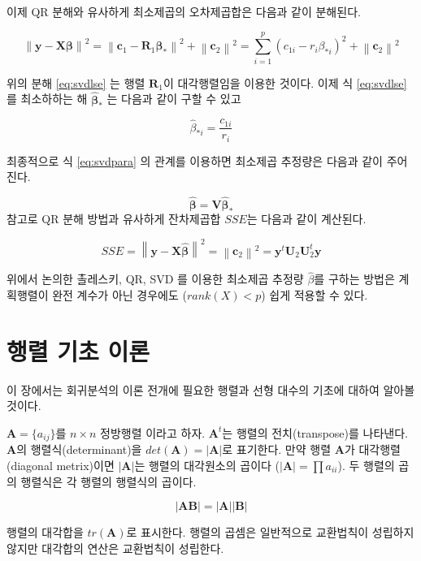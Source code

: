 \documentclass[
]{book}
\makeatletter
\newcommand{\norm}[1]{\left\lVert#1\right\rVert}
\newenvironment{kframe}{%
\medskip{}
\setlength{\fboxsep}{.8em}
 \def\at@end@of@kframe{}%
 \ifinner\ifhmode%
  \def\at@end@of@kframe{\end{minipage}}%
  \begin{minipage}{\columnwidth}%
 \fi\fi%
 \def\FrameCommand##1{\hskip\@totalleftmargin \hskip-\fboxsep
 \colorbox{shadecolor}{##1}\hskip-\fboxsep
     \hskip-\linewidth \hskip-\@totalleftmargin \hskip\columnwidth}%
 \MakeFramed {\advance\hsize-\width
   \@totalleftmargin\z@ \linewidth\hsize
   \@setminipage}}%
 {\par\unskip\endMakeFramed%
 \at@end@of@kframe}
\newenvironment{rmdblock}[1]
  {
  \begin{itemize}
  \renewcommand{\labelitemi}{
    \raisebox{-.7\height}[0pt][0pt]{
      {\setkeys{Gin}{width=3em,keepaspectratio}\texttt{[image: images/\#1]}}
    }
  }
  \setlength{\fboxsep}{1em}
  \begin{kframe}
  \item
  }
  {
  \end{kframe}
  \end{itemize}
  }
\newenvironment{rmdnote}
  {\begin{rmdblock}{note}}
  {\end{rmdblock}}
\theoremstyle{definition}
\theoremstyle{definition}
\theoremstyle{definition}
\theoremstyle{remark}
\makeatother
\begin{document}
이제 QR 분해와 유사하게 최소제곱의 오차제곱합은 다음과 같이 분해된다.

\begin{equation}
\norm{ \bm y-\bm X \bm \beta}^2  = 
\norm{ \bm c_1 - \bm R_1 \bm \beta_* }^2 + \norm{\bm c_2}^2 
 =\sum_{i=1}^p (c_{1i} - r_i \beta_{*i})^2 + \norm{\bm c_2}^2 
\label{eq:svdlse}
\end{equation}

위의 분해 \eqref{eq:svdlse} 는 행렬 \(\bm R_1\)이 대각행렬임을 이용한 것이다. 이제 식 \eqref{eq:svdlse} 를 최소하하는 해
\(\hat {\bm \beta}_*\) 는 다음과 같이 구할 수 있고

\[ \hat \beta_{*i} =\frac{ c_{1i}}{r_i} \]

최종적으로 식 \eqref{eq:svdpara} 의 관계를 이용하면 최소제곱 추정량은 다음과 같이 주어진다.

\[ \hat {\bm \beta} = \bm V \hat {\bm \beta}_* \]
참고로 QR 분해 방법과 유사하게 잔차제곱합 \(SSE\)는 다음과 같이 계산된다.

\[ SSE = \norm{ \bm y-\bm X \hat {\bm \beta}}^2 = \norm{\bm c_2}^2 = \bm y^t \bm U_2 \bm U_2^t \bm y \]

\begin{rmdnote}
위에서 논의한 촐레스키, QR, SVD 를 이용한 최소제곱 추정량 \(\hat \beta\)를 구하는 방법은 계획행렬이
완전 계수가 아닌 경우에도 (\(rank(X)<p\)) 쉽게 적용할 수 있다.
\end{rmdnote}

\hypertarget{appendix-appendix}{%
\appendix {}}


\hypertarget{matalgebra}{%
\chapter{행렬 기초 이론}\label{matalgebra}}

이 장에서는 회귀분석의 이론 전개에 필요한 행렬과 선형 대수의 기초에 대하여 알아볼 것이다.

\(\bm A = \{ a_{ij} \}\)를 \(n \times n\) 정방행렬 이라고 하자. \(\bm A^t\)는 행렬의 전치(transpose)를 나타낸다. \(\bm A\)의 행렬식(determinant)을 \(det(\bm A)=|\bm A|\)로 표기한다. 만약 행렬 \(\bm A\)가 대각행렬(diagonal metrix)이면 \(|\bm A|\)는 행렬의 대각원소의 곱이다 (\(| \bm A| =\prod a_{ii}\)). 두 행렬의 곱의 행렬식은 각 행렬의 행렬식의 곱이다.

\[ |\bm A \bm B | = | \bm A| |\bm B| \]

행렬의 대각합을 \(tr(\bm A)\)로 표시한다. 행렬의 곱셈은 일반적으로 교환법칙이 성립하지 않지만 대각합의 연산은 교환법칙이 성립한다.
\end{document}
